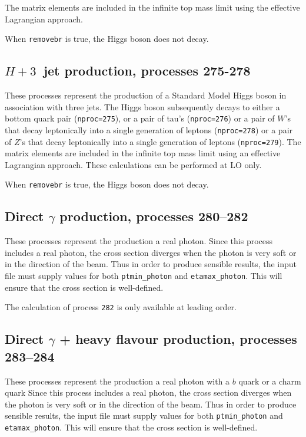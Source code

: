 \documentclass{article}
\begin{document}
{{{{{{The matrix elements are included in the infinite top mass limit
using the effective Lagrangian approach. 

When {\tt removebr} is true, the Higgs boson does not decay.

\subsection{$H + 3$~jet production, processes 275-278}

These processes represent the production of a Standard Model Higgs boson
in association with three jets. The Higgs boson
subsequently decays to either a bottom quark pair ({\tt nproc=275}), 
or a pair of tau's ({\tt nproc=276})
or a pair of $W$'s that decay leptonically into a single generation of leptons ({\tt nproc=278})
or a pair of $Z$'s that decay leptonically into a single generation of leptons ({\tt nproc=279}).
The matrix elements are included in the infinite top mass limit
using an effective Lagrangian approach. These calculations can be
performed at LO only.

When {\tt removebr} is true, the Higgs boson does not decay.

\subsection{Direct $\gamma$ production, processes 280--282}
\label{subsec:dirphot}

These processes represent the production a real photon.
Since this process includes a real photon, the cross section diverges
when the photon is very soft or in the direction of the beam.
Thus in order to produce sensible results, the input file must supply values for both
{\tt ptmin\_photon} and {\tt etamax\_photon}. This will ensure that
the cross section is well-defined.

The calculation of process {\tt 282} is only available at leading order.

\subsection{Direct $\gamma$ + heavy flavour production, processes 283--284}
\label{subsec:heavyfl}

These processes represent the production a real photon with a $b$ quark
or a charm quark
Since this process includes a real photon, the cross section diverges
when the photon is very soft or in the direction of the beam.
Thus in order to produce sensible results, the input file must supply values for both
{\tt ptmin\_photon} and {\tt etamax\_photon}. This will ensure that
the cross section is well-defined.

}}}}}}
\end{document}
